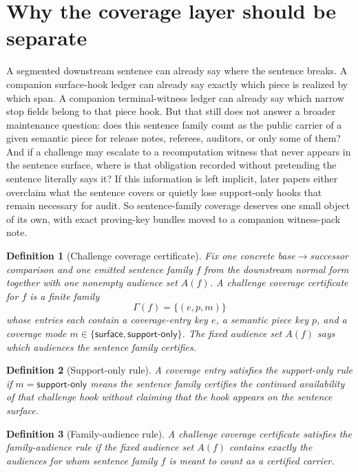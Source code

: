 \documentclass[11pt]{article}
\newtheorem{definition}{Definition}
\begin{document}
\section{Why the coverage layer should be separate}
A segmented downstream sentence can already say where the sentence breaks.
A companion surface-hook ledger can already say exactly which piece is realized by which span.
A companion terminal-witness ledger can already say which narrow stop fields belong to that piece hook.
But that still does not answer a broader maintenance question: does this sentence family count as the public carrier of a given semantic piece for release notes, referees, auditors, or only some of them?
And if a challenge may escalate to a recomputation witness that never appears in the sentence surface, where is that obligation recorded without pretending the sentence literally says it?
If this information is left implicit, later papers either overclaim what the sentence covers or quietly lose support-only hooks that remain necessary for audit.
So sentence-family coverage deserves one small object of its own, with exact proving-key bundles moved to a companion witness-pack note.

\begin{definition}[Challenge coverage certificate]
Fix one concrete base$\to$successor comparison and one emitted sentence family $f$ from the downstream normal form together with one nonempty audience set $A(f)$.
A \emph{challenge coverage certificate} for $f$ is a finite family
\[
\Gamma(f)=\{(e,p,m)\}
\]
whose entries each contain a coverage-entry key $e$, a semantic piece key $p$, and a coverage mode $m\in\{\textsf{surface},\textsf{support-only}\}$.
The fixed audience set $A(f)$ says which audiences the sentence family certifies.
\end{definition}

\begin{definition}[Support-only rule]
A coverage entry satisfies the \emph{support-only rule} if $m=\textsf{support-only}$ means the sentence family certifies the continued availability of that challenge hook without claiming that the hook appears on the sentence surface.
\end{definition}

\begin{definition}[Family-audience rule]
A challenge coverage certificate satisfies the \emph{family-audience rule} if the fixed audience set $A(f)$ contains exactly the audiences for whom sentence family $f$ is meant to count as a certified carrier.
\end{definition}
\end{document}
